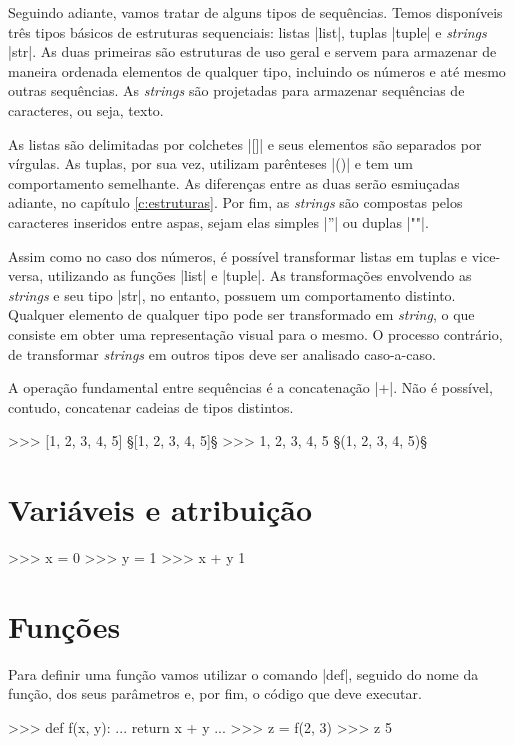 	Seguindo adiante, vamos tratar de alguns tipos de sequências. Temos disponíveis três tipos básicos de estruturas sequenciais: listas |list|, tuplas |tuple| e \textit{strings} |str|. As duas primeiras são estruturas de uso geral e servem para armazenar de maneira ordenada elementos de qualquer tipo, incluindo os números e até mesmo outras sequências. As \textit{strings} são projetadas para armazenar sequências de caracteres, ou seja, texto. \par

	As listas são delimitadas por colchetes |[]| e seus elementos são separados por vírgulas. As tuplas, por sua vez, utilizam parênteses |()| e tem um comportamento semelhante. As diferenças entre as duas serão esmiuçadas adiante, no capítulo \ref{c:estruturas}. Por fim, as \textit{strings} são compostas pelos caracteres inseridos entre aspas, sejam elas simples |''| ou duplas |""|.\par

	Assim como no caso dos números, é possível transformar listas em tuplas e vice-versa, utilizando as funções |list| e |tuple|. As transformações envolvendo as \textit{strings} e seu tipo |str|, no entanto, possuem um comportamento distinto. Qualquer elemento de qualquer tipo pode ser transformado em \textit{string}, o que consiste em obter uma representação visual para o mesmo. O processo contrário, de transformar \textit{strings} em outros tipos deve ser analisado caso-a-caso. \par

	A operação fundamental entre sequências é a concatenação |+|. Não é possível, contudo, concatenar cadeias de tipos distintos.

	\begin{pyprompt}
	>>> [1, 2, 3, 4, 5]
	§[1, 2, 3, 4, 5]§
	>>> 1, 2, 3, 4, 5
	§(1, 2, 3, 4, 5)§
	\end{pyprompt}
	
	\section*{Variáveis e atribuição}%
	\begin{lstpython}
	>>> x = 0
	>>> y = 1
	>>> x + y
	1
	\end{lstpython}

	\section*{Funções}%
	Para definir uma função vamos utilizar o comando |def|, seguido do nome da função, dos seus parâmetros e, por fim, o código que deve executar.
	\begin{lstpython}
	>>> def f(x, y):
	...		return x + y
	...
	>>> z = f(2, 3)
	>>> z
	5
	\end{lstpython}


